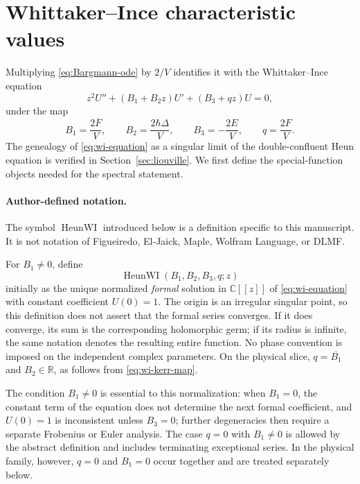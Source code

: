 \documentclass[11pt]{article}
\theoremstyle{remark}
\newcommand{\C}{\mathbb{C}}
\begin{document}
\section{Whittaker--Ince characteristic values}
\label{sec:heunwi}

Multiplying \eqref{eq:Bargmann-ode} by \(2/V\) identifies it with the
Whittaker--Ince equation
\begin{equation}
 z^2U''+(B_1+B_2z)U'+(B_3+qz)U=0,
 \label{eq:wi-equation}
\end{equation}
under the map
\begin{equation}
 B_1=\frac{2\overline F}{V},\qquad
 B_2=\frac{2\hbar\Delta}{V},\qquad
 B_3=-\frac{2E}{V},\qquad
 q=\frac{2F}{V}.
 \label{eq:wi-kerr-map}
\end{equation}
The genealogy of \eqref{eq:wi-equation} as a singular limit of the
double-confluent Heun equation is verified in
Section~\ref{sec:liouville}.  We first define the special-function objects
needed for the spectral statement.

\paragraph{Author-defined notation.}
The symbol \(\operatorname{HeunWI}\) introduced below is a definition
specific to this manuscript.  It is not notation of Figueiredo, El-Jaick,
Maple, Wolfram Language, or DLMF.

For \(B_1\ne0\), define
\begin{equation}
 \operatorname{HeunWI}(B_1,B_2,B_3,q;z)
 \label{eq:heunwi-formal}
\end{equation}
initially as the unique normalized \emph{formal} solution in
\(\C[[z]]\) of \eqref{eq:wi-equation} with constant coefficient \(U(0)=1\).
The origin is an irregular singular point, so this definition does not assert
that the formal series converges.  If it does converge, its sum is the
corresponding holomorphic germ; if its radius is infinite, the same notation
denotes the resulting entire function.  No phase convention is imposed on
the independent complex parameters.  On the physical slice,
\(q=\overline{B_1}\) and \(B_2\in\mathbb R\), as follows from
\eqref{eq:wi-kerr-map}.

The condition \(B_1\ne0\) is essential to this normalization: when \(B_1=0\),
the constant term of the equation does not determine the next formal
coefficient, and \(U(0)=1\) is inconsistent unless \(B_3=0\); further
degeneracies then require a separate Frobenius or Euler analysis.  The case
\(q=0\) with \(B_1\ne0\) is allowed by the abstract definition and includes
terminating exceptional series.  In the physical family, however, \(q=0\)
and \(B_1=0\) occur together and are treated separately below.
\end{document}
